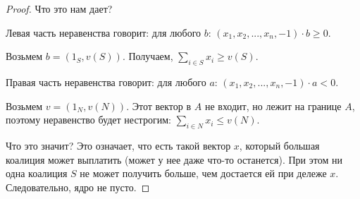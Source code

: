 \begin{proof}
Что это нам дает?

Левая часть неравенства говорит: для любого $b$: $(x_{1},x_{2},...,x_{n},-1)\cdot b \geq 0$.

Возьмем $b=(1_{S},v(S))$. Получаем, $\sum_{i\in S}x_{i}\geq v(S)$.

Правая часть неравенства говорит: для любого $a$: $(x_{1},x_{2},...,x_{n},-1)\cdot a <0$.

Возьмем $v=(1_{N},v(N))$. Этот вектор в $A$ не входит, но лежит на границе $A$, поэтому неравенство будет нестрогим: $\sum_{i\in N}x_{i}\leq v(N)$.

Что это значит? Это означает, что есть такой вектор $x$, который большая коалиция может выплатить (может у нее даже что-то останется). При этом ни одна коалиция $S$ не может получить больше, чем достается ей при дележе $x$. Следовательно, ядро не пусто.

\end{proof}
